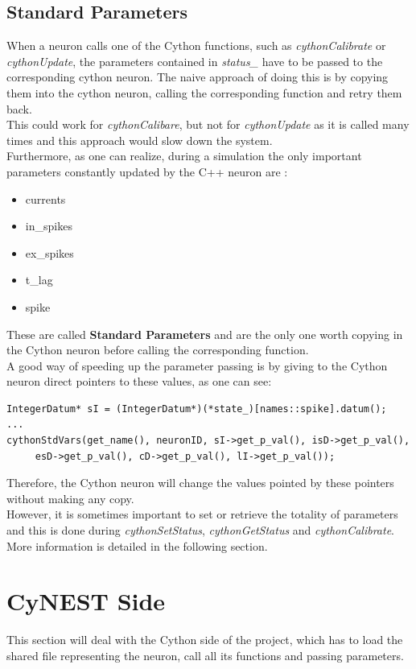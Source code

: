 \documentclass{article}
\begin{document}
\subsection{Standard Parameters}
When a neuron calls one of the Cython functions, such as \emph{cythonCalibrate} or \emph{cythonUpdate}, the parameters contained in \emph{status\_} have to be passed to the corresponding cython neuron. The naive approach of doing this is by copying them into the cython neuron, calling the corresponding function and retry them back.\\
This could work for \emph{cythonCalibare}, but not for \emph{cythonUpdate} as it is called many times and this approach would slow down the system. \\
Furthermore, as one can realize, during a simulation the only important parameters constantly updated by the C++ neuron are :\\
\begin{itemize}
\item currents
\item in\_spikes
\item ex\_spikes
\item t\_lag
\item spike
\end{itemize}
These are called \textbf{Standard Parameters} and are the only one worth copying in the Cython neuron before calling the corresponding function.\\
A good way of speeding up the parameter passing is by giving to the Cython neuron direct pointers to these values, as one can see:
\begin{verbatim}
IntegerDatum* sI = (IntegerDatum*)(*state_)[names::spike].datum();
...
cythonStdVars(get_name(), neuronID, sI->get_p_val(), isD->get_p_val(), 
     esD->get_p_val(), cD->get_p_val(), lI->get_p_val());
\end{verbatim}
Therefore, the Cython neuron will change the values pointed by these pointers without making any copy.\\
However, it is sometimes important to set or retrieve the totality of parameters and this is done during \emph{cythonSetStatus}, \emph{cythonGetStatus} and \emph{cythonCalibrate}.
More information is detailed in the following section.
\section{CyNEST Side}
This section will deal with the Cython side of the project, which has to load the shared file representing the neuron, call all its functions and passing parameters.
\end{document}
